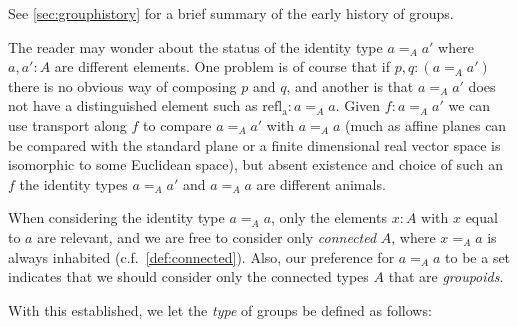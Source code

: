 See \cref{sec:grouphistory} for a brief summary of the early history of groups.
\begin{remark}
  The reader may wonder about the status of the identity type $a=_Aa'$ where $a,a':A$ are different elements.  One problem is of course that if $p,q:(a=_Aa')$ there is no obvious way of composing $p$ and $q$, and another is that $a=_Aa'$ does not have a distinguished element such as $\mathrm{refl{}_a}:a=_Aa$.
Given $f:a=_Aa'$ we can use transport along $f$ to compare $a=_Aa'$ with $a=_Aa$ (much as affine planes can be compared with the standard plane or a finite dimensional real vector space is isomorphic to some Euclidean space), but absent existence and choice of such an $f$ the identity types $a=_Aa'$ and $a=_Aa$ are different animals.
\end{remark}


\begin{remark}
  When considering the identity type $a=_Aa$, only the elements $x:A$ with $x$ equal to $a$ are relevant, and we are free to consider only \emph{connected} $A$, \ie where $x=_Aa$ is always inhabited (c.f.~\cref{def:connected}).  Also, our preference for $a=_Aa$ to be a set indicates that we should consider only the connected types $A$ that are \emph{groupoids}.
\end{remark}


With this established, we let the \emph{type} of groups be defined as follows:

